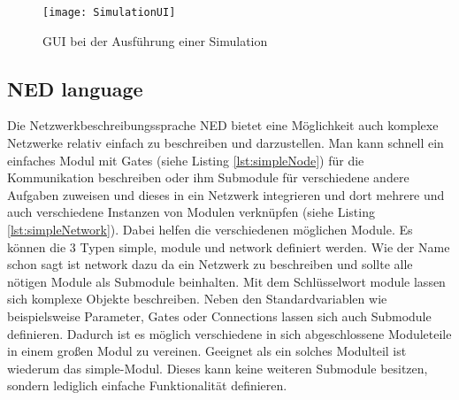 \begin{figure}[htbp]
\centering
\caption{GUI bei der Ausführung einer Simulation }
\label{fig:messageEvent}
\texttt{[image: SimulationUI]}
\end{figure}

\subsection{NED language}

Die Netzwerkbeschreibungssprache NED\cite{ned} bietet eine Möglichkeit auch komplexe Netzwerke relativ einfach zu beschreiben und darzustellen. Man kann schnell ein einfaches Modul mit Gates (siehe Listing \ref{lst:simpleNode}) für die Kommunikation beschreiben oder ihm Submodule für verschiedene andere Aufgaben zuweisen und dieses in ein Netzwerk integrieren und dort mehrere und auch verschiedene Instanzen von Modulen verknüpfen (siehe Listing \ref{lst:simpleNetwork}). 
\newline
Dabei helfen die verschiedenen möglichen Module. Es können die 3 Typen simple, module und network definiert werden. Wie der Name schon sagt ist network dazu da ein Netzwerk zu beschreiben und sollte alle nötigen Module als Submodule beinhalten.
\newline
Mit dem Schlüsselwort module lassen sich komplexe Objekte beschreiben. Neben den Standardvariablen wie beispielsweise Parameter, Gates oder Connections lassen sich auch Submodule definieren. Dadurch ist es möglich verschiedene in sich abgeschlossene Moduleteile in einem großen Modul zu vereinen.
\newline
Geeignet als ein solches Modulteil ist wiederum das simple-Modul. Dieses kann keine weiteren Submodule besitzen, sondern lediglich einfache Funktionalität definieren.

